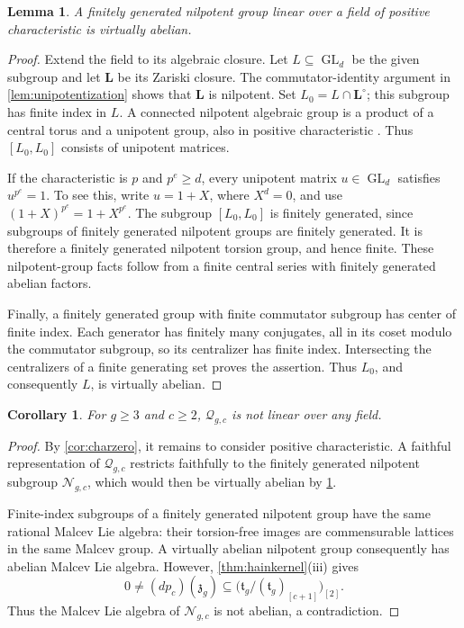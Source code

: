 \documentclass[11pt,a4paper]{article}
\newtheorem{lemma}[theorem]{Lemma}
\newtheorem{corollary}[theorem]{Corollary}
\theoremstyle{definition}
\newcommand{\GL}{\operatorname{GL}}
\begin{document}
\begin{lemma}\label{lem:positivechar}
A finitely generated nilpotent group linear over a field of positive
characteristic is virtually abelian.
\end{lemma}
\begin{proof}
Extend the field to its algebraic closure. Let \(L\subseteq\GL_d\) be
the given subgroup and let \(\mathbf L\) be its Zariski closure. The
commutator-identity argument in \cref{lem:unipotentization} shows
that \(\mathbf L\) is nilpotent. Set
\(L_0=L\cap\mathbf L^\circ\); this subgroup has finite index
in \(L\). A connected nilpotent algebraic group is a product of a
central torus and a unipotent group, also in positive characteristic
\cite[Section~10]{Borel}. Thus \([L_0,L_0]\) consists of unipotent
matrices.

If the characteristic is \(p\) and \(p^e\ge d\), every unipotent
matrix \(u\in\GL_d\) satisfies \(u^{p^e}=1\). To see this,
write \(u=1+X\), where \(X^d=0\), and use
\((1+X)^{p^e}=1+X^{p^e}\). The subgroup \([L_0,L_0]\) is finitely
generated, since subgroups of finitely generated nilpotent groups are
finitely generated. It is therefore a finitely generated nilpotent
torsion group, and hence finite. These nilpotent-group facts follow
from a finite central series with finitely generated abelian factors.

Finally, a finitely generated group with finite commutator subgroup
has center of finite index. Each generator has finitely many conjugates,
all in its coset modulo the commutator subgroup, so its centralizer has
finite index. Intersecting the centralizers of a finite generating set
proves the assertion. Thus \(L_0\), and consequently \(L\), is
virtually abelian.
\end{proof}

\begin{corollary}\label{cor:allfields}
For \(g\ge3\) and \(c\ge2\), \(\mathcal{Q}_{g,c}\) is not linear over
any field.
\end{corollary}
\begin{proof}
By \cref{cor:charzero}, it remains to consider positive characteristic.
A faithful representation of \(\mathcal{Q}_{g,c}\) restricts faithfully to
the finitely generated nilpotent subgroup \(\mathcal{N}_{g,c}\), which would
then be virtually abelian by \cref{lem:positivechar}.

Finite-index subgroups of a finitely generated nilpotent group have
the same rational Malcev Lie algebra: their torsion-free images are
commensurable lattices in the same Malcev group. A virtually abelian
nilpotent group consequently has abelian Malcev Lie algebra. However,
\cref{thm:hainkernel}(iii) gives
\[
 0\ne(dp_c)(\mathfrak z_g)\subseteq
 \bigl(\mathfrak t_g/(\mathfrak t_g)_{[c+1]}\bigr)_{[2]}.
\]
Thus the Malcev Lie algebra of \(\mathcal{N}_{g,c}\) is not abelian, a
contradiction.
\end{proof}
\end{document}

